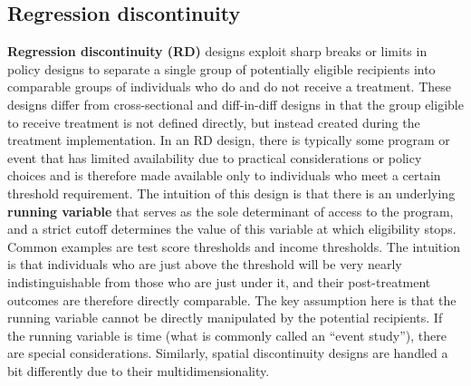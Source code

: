 \subsection{Regression discontinuity}

\textbf{Regression discontinuity (RD)} designs exploit sharp breaks or limits
in policy designs to separate a single group of potentially eligible recipients
into comparable groups of individuals who do and do not receive a treatment.
These designs differ from cross-sectional and diff-in-diff designs
in that the group eligible to receive treatment is not defined directly,
but instead created during the treatment implementation.
In an RD design, there is typically some program or event
that has limited availability due to practical considerations or policy choices
and is therefore made available only to individuals who meet a certain threshold requirement.
The intuition of this design is that there is an underlying \textbf{running variable}
that serves as the sole determinant of access to the program,
and a strict cutoff determines the value of this variable at which eligibility stops.\cite{imbens2008regression}
Common examples are test score thresholds and income thresholds.
The intuition is that individuals who are just above the threshold
will be very nearly indistinguishable from those who are just under it,
and their post-treatment outcomes are therefore directly comparable.\cite{lee2010regression}
The key assumption here is that the running variable cannot be directly manipulated
by the potential recipients.
If the running variable is time (what is commonly called an ``event study''),
there are special considerations.\cite{hausman2018regression}
Similarly, spatial discontinuity designs are handled a bit differently due to their multidimensionality.

